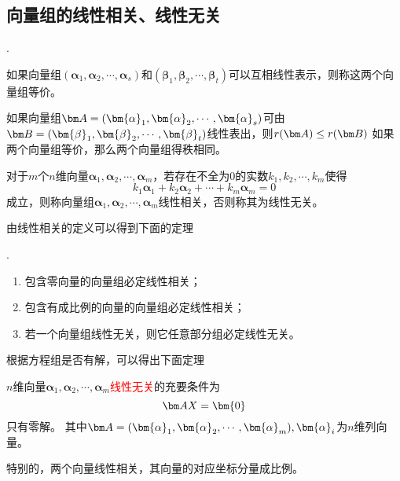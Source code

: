 \subsection{向量组的线性相关、线性无关}
.
\begin{theorem}
    如果向量组$(\bm{\alpha}_1,\bm{\alpha}_2,\cdots,\bm{\alpha}_s)$和$(\bm{\beta}_1,\bm{\beta}_2,\cdots,\bm{\beta}_t)$可以互相线性表示，则称这两个向量组等价。
\end{theorem}

\begin{theorem}
    如果向量组$\mat{A} = (\bm{\alpha}_1,\bm{\alpha}_2,\cdots,\bm{\alpha}_s)$可由$\mat{B} = (\bm{\beta}_1,\bm{\beta}_2,\cdots,\bm{\beta}_t)$线性表出，则$r(\mat{A})\leq r(\mat{B})$
    如果两个向量组等价，那么两个向量组得秩相同。
\end{theorem}

\begin{definition}
    对于$m$个$n$维向量$\bm{\alpha}_1,\bm{\alpha}_2,\cdots,\bm{\alpha}_m$，若存在不全为$0$的实数$k_1,k_2,\cdots,k_m$使得
    \[ k_1\bm{\alpha}_1 + k_2\bm{\alpha}_2 + \cdots + k_m\bm{\alpha}_m = 0 \]
    成立，则称向量组$\bm{\alpha}_1,\bm{\alpha}_2,\cdots,\bm{\alpha}_m$线性相关，否则称其为线性无关。
\end{definition}
由线性相关的定义可以得到下面的定理
\begin{theorem}
    .
    \begin{enumerate}
        \item 包含零向量的向量组必定线性相关；
        \item 包含有成比例的向量的向量组必定线性相关；
        \item 若一个向量组线性无关，则它任意部分组必定线性无关。
    \end{enumerate}
\end{theorem}

根据方程组是否有解，可以得出下面定理
\begin{theorem}
    $n$维向量$\bm{\alpha}_1,\bm{\alpha}_2,\cdots,\bm{\alpha}_m$\textcolor{red}{线性无关}的充要条件为
    \[\mat{AX}=\bm{0}\]
    只有零解。
    其中$\mat{A}=(\bm{\alpha}_1,\bm{\alpha}_2,\cdots,\bm{\alpha}_m),\bm{\alpha}_i$为$n$维列向量。
\end{theorem}
特别的，两个向量线性相关，其向量的对应坐标分量成比例。

